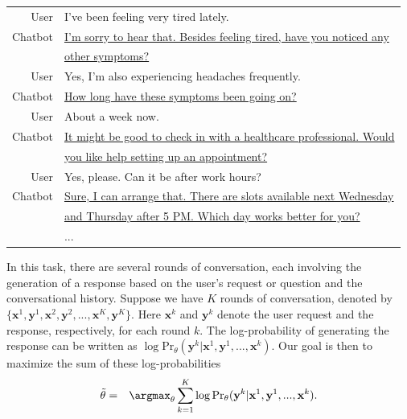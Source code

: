 \vspace{0.5em}
\begin{tcolorbox}

\begingroup
\renewcommand{\arraystretch}{1.0}
\setlength{\tabcolsep}{6pt}
\begin{tabular}{r l}
{\color{gray} \small{User}} & I've been feeling very tired lately.\\  [0.1cm]
{\color{gray} \small{Chatbot}} & \uline{I'm sorry to hear that. Besides feeling tired, have you noticed any}  \\
& \uline{other symptoms?} \\ [0.2cm]
{\color{gray} \small{User}} & Yes, I'm also experiencing headaches frequently.\\  [0.1cm]
{\color{gray} \small{Chatbot}} & \uline{How long have these symptoms been going on?}  \\ [0.2cm]
{\color{gray} \small{User}} & About a week now.\\  [0.1cm]
{\color{gray} \small{Chatbot}} & \uline{It might be good to check in with a healthcare professional. Would}  \\
& \uline{you like help setting up an appointment?} \\ [0.2cm]
{\color{gray} \small{User}} & Yes, please. Can it be after work hours?\\  [0.1cm]
{\color{gray} \small{Chatbot}} & \uline{Sure, I can arrange that. There are slots available next Wednesday} \\ [0.1cm]
& \uline{and Thursday after 5 PM. Which day works better for you?} \\ [0.2cm]
& ...
\end{tabular}
\endgroup

\end{tcolorbox}
\vspace{0.5em}

In this task, there are several rounds of conversation, each involving the generation of a response based on the user's request or question and the conversational history. Suppose we have $K$ rounds of conversation, denoted by $\{\mathbf{x}^1,\mathbf{y}^1,\mathbf{x}^2,\mathbf{y}^2,...,\mathbf{x}^K,\mathbf{y}^K\}$. Here $\mathbf{x}^k$ and $\mathbf{y}^k$ denote the user request and the response, respectively, for each round $k$. The log-probability of generating the response can be written as $\log \mathrm{Pr}_{\theta}(\mathbf{y}^k|\mathbf{x}^1,\mathbf{y}^1,...,\mathbf{x}^k)$. Our goal is then to maximize the sum of these log-probabilities
\begin{eqnarray}
\tilde{\theta} & = & \argmax_{\theta} \sum_{k=1}^{K} \log \mathrm{Pr}_{\theta}(\mathbf{y}^k|\mathbf{x}^1,\mathbf{y}^1,...,\mathbf{x}^k). \label{eq:sft-xy-conversation-objective-function}
\end{eqnarray}

